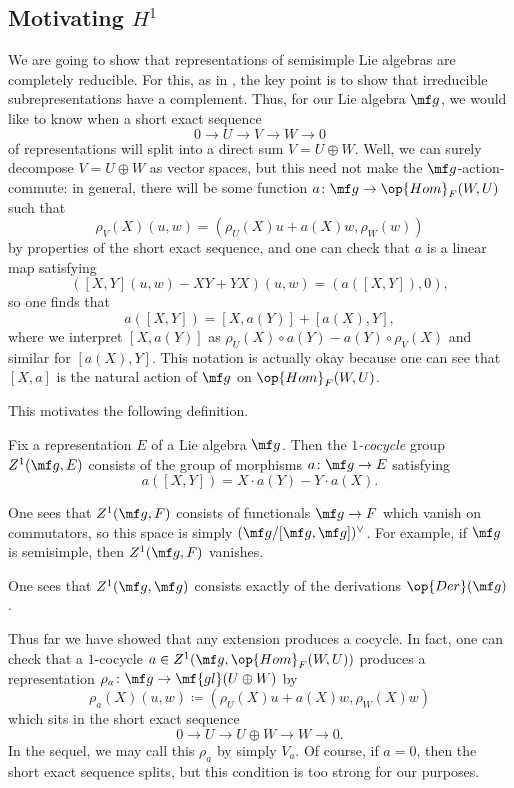 \documentclass[../notes.tex]{subfiles}
\begin{document}
\subsection{Motivating \texorpdfstring{$H^1$}{ H1}}
We are going to show that representations of semisimple Lie algebras are completely reducible. For this, as in , the key point is to show that irreducible subrepresentations have a complement. Thus, for our Lie algebra $\mf g$, we would like to know when a short exact sequence
\[0\to U\to V\to W\to0\]
of representations will split into a direct sum $V=U\oplus W$. Well, we can surely decompose $V=U\oplus W$ as vector spaces, but this need not make the $\mf g$-action-commute: in general, there will be some function $a\colon\mf g\to\op{Hom}_F(W,U)$ such that
\[\rho_V(X)(u,w)=(\rho_U(X)u+a(X)w,\rho_W(w))\]
by properties of the short exact sequence, and one can check that $a$ is a linear map satisfying
\[([X,Y](u,w)-XY+YX)(u,w)=(a([X,Y]),0),\]
so one finds that
\[a([X,Y])=[X,a(Y)]+[a(X),Y],\]
where we interpret $[X,a(Y)]$ as $\rho_U(X)\circ a(Y)-a(Y)\circ\rho_V(X)$ and similar for $[a(X),Y]$. This notation is actually okay because one can see that $[X,a]$ is the natural action of $\mf g$ on $\op{Hom}_F(W,U)$.

This motivates the following definition.
\begin{defihelper}[$Z^1(\mf g,E)$] 
	Fix a representation $E$ of a Lie algebra $\mf g$. Then the \textit{$1$-cocycle} group $Z^1(\mf g,E)$ consists of the group of morphisms $a\colon\mf g\to E$ satisfying
	\[a([X,Y])=X\cdot a(Y)-Y\cdot a(X).\]
\end{defihelper}
\begin{example} \label{ex:cocycle-trivial-rep}
	One sees that $Z^1(\mf g,F)$ consists of functionals $\mf g\to F$ which vanish on commutators, so this space is simply $(\mf g/[\mf g,\mf g])^\lor$. For example, if $\mf g$ is semisimple, then $Z^1(\mf g,F)$ vanishes.
\end{example}
\begin{example}
	One sees that $Z^1(\mf g,\mf g)$ consists exactly of the derivations $\op{Der}(\mf g)$.
\end{example}
Thus far we have showed that any extension produces a cocycle. In fact, one can check that a $1$-cocycle $a\in Z^1(\mf g,\op{Hom}_F(W,U))$ produces a representation $\rho_a\colon\mf g\to\mf{gl}(U\oplus W)$ by
\[\rho_a(X)(u,w)\coloneqq(\rho_U(X)u+a(X)w,\rho_W(X)w)\]
which sits in the short exact sequence
\[0\to U\to U\oplus W\to W\to0.\]
In the sequel, we may call this $\rho_a$ by simply $V_a$. Of course, if $a=0$, then the short exact sequence splits, but this condition is too strong for our purposes.
\end{document}
